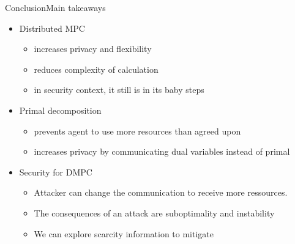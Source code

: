 \documentclass[handout,aspectratio=169]{beamer}
\begin{document}
\begin{frame}{Conclusion}{Main takeaways}
  \begin{itemize}[<+(1)->]
    \item Distributed MPC
          \begin{itemize}
            \item increases privacy and flexibility
            \item reduces complexity of calculation
            \item in security context, it still is in its baby steps
          \end{itemize}
    \item Primal decomposition
          \begin{itemize}
            \item prevents agent to use more resources than agreed upon
            \item increases privacy by communicating dual variables instead of primal
          \end{itemize}
    \item Security for DMPC
          \begin{itemize}
            \item Attacker can change the communication to receive more ressources.
            \item The consequences of an attack are suboptimality and instability
            \item We can explore scarcity information to mitigate
          \end{itemize}
  \end{itemize}
\end{frame}


\end{document}
